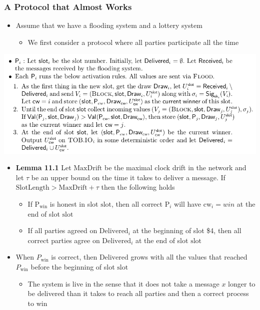 \documentclass[11pt]{article}
\begin{document}
\subsubsection{A Protocol that Almost Works}
\label{sec:org1e439f1}
\begin{itemize}
\item Assume that we have a flooding system and a lottery system
\begin{itemize}
\item We first consider a protocol where all parties participate all the time
\end{itemize}
\end{itemize}
\begin{center}
\includegraphics[width=.9\linewidth]{Blockchains/screenshot_2018-10-28_09-10-32.png}
\end{center}


\begin{itemize}
\item \textbf{Lemma 11.1} Let \(\text{MaxDrift}\) be the maximal clock drift in the network and let \(\tau\) be an upper bound on the time it takes to deliver a message. If \(\text{SlotLength} > \text{MaxDrift} + \tau\) then the following holds
\begin{itemize}
\item If \(\text{P}_\text{win}\) is honest in slot \(\text{slot}\), then all correct \(\text{P}_i\) will have \(\text{cw}_i = win\) at the end of slot \(\text{slot}\)
\item If all parties agreed on \(\text{Delivered}_i\) at the beginning of slot \$4, then all correct parties agree on \(\text{Delivered}_i\) at the end of slot \(\text{slot}\)
\end{itemize}

\item When \(P_\text{win}\) is correct, then \(\text{Delivered}\) grows with all the values that reached \(P_\text{win}\) before the beginning of slot \(\text{slot}\)
\begin{itemize}
\item The system is live in the sense that it does not take a message \(x\) longer to be delivered than it takes to reach all parties and then a correct process to win
\end{itemize}
\end{itemize}
\end{document}
